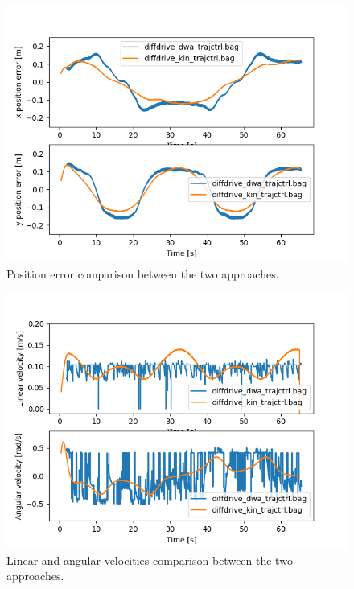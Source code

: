\documentclass[11pt,a4paper]{article}
\begin{document}
\begin{figure}[H]
    \centering
    \includegraphics[scale=0.4]{comparison/Position_Error.png}
    \caption{Position error comparison between the two approaches.}
\end{figure}

\begin{figure}[H]
    \centering
    \includegraphics[scale=0.4]{comparison/Linear_and_Angular_Velocities.png}
    \caption{Linear and angular velocities comparison between the two approaches.}
\end{figure}
\end{document}
